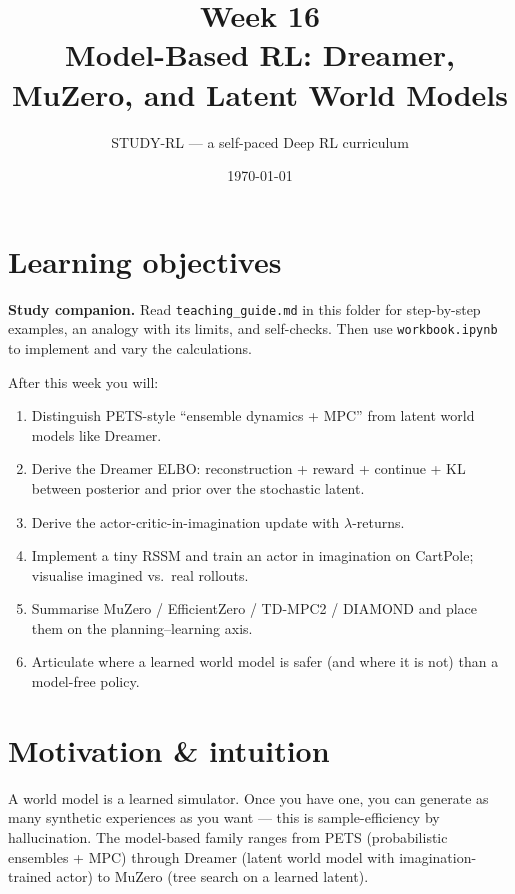 \documentclass[11pt,oneside]{scrbook}
\title{{\color{rlblue}\textbf{Week 16} \\ \Huge Model-Based RL: Dreamer, MuZero, and Latent World Models}}
\author{STUDY-RL --- a self-paced Deep RL curriculum}
\date{\today}
\begin{document}
\maketitle
\tableofcontents
\newpage

\chapter*{Learning objectives}

\noindent\textbf{Study companion.} Read \texttt{teaching\_guide.md} in this
folder for step-by-step examples, an analogy with its limits, and self-checks.
Then use \texttt{workbook.ipynb} to implement and vary the calculations.
\par\medskip

\begin{keyidea}
After this week you will:
\begin{enumerate}
  \item Distinguish PETS-style ``ensemble dynamics + MPC'' from latent world models like Dreamer.
  \item Derive the Dreamer ELBO: reconstruction + reward + continue + KL between posterior and prior over the stochastic latent.
  \item Derive the actor-critic-in-imagination update with $\lambda$-returns.
  \item Implement a tiny RSSM and train an actor in imagination on CartPole; visualise imagined vs.\ real rollouts.
  \item Summarise MuZero / EfficientZero / TD-MPC2 / DIAMOND and place them on the planning--learning axis.
  \item Articulate where a learned world model is safer (and where it is not) than a model-free policy.
\end{enumerate}
\end{keyidea}

\chapter{Motivation \& intuition}

A world model is a learned simulator. Once you have one, you can generate as many synthetic experiences as you want --- this is sample-efficiency by hallucination. The model-based family ranges from PETS (probabilistic ensembles + MPC) through Dreamer (latent world model with imagination-trained actor) to MuZero (tree search on a learned latent).
\end{document}
